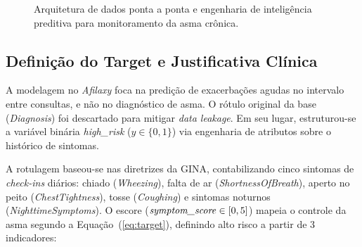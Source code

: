 \documentclass[12pt]{article}
\begin{document}
\begin{figure}[ht!]
\caption{Arquitetura de dados ponta a ponta e engenharia de inteligência preditiva para monitoramento da asma crônica.}
\label{fig:fluxograma_asma}
\end{figure}

\subsection{Definição do Target e Justificativa Clínica}

A modelagem no \textit{Afilaxy} foca na predição de exacerbações agudas no intervalo entre consultas, e não no diagnóstico de asma. O rótulo original da base (\textit{Diagnosis}) foi descartado para mitigar \textit{data leakage}. Em seu lugar, estruturou-se a variável binária \textit{high\_risk} ($y \in \{0, 1\}$) via engenharia de atributos sobre o histórico de sintomas.

A rotulagem baseou-se nas diretrizes da GINA, contabilizando cinco sintomas de \textit{check-ins} diários: chiado (\textit{Wheezing}), falta de ar (\textit{ShortnessOfBreath}), aperto no peito (\textit{ChestTightness}), tosse (\textit{Coughing}) e sintomas noturnos (\textit{NighttimeSymptoms}). O escore ($\text{\textit{symptom\_score}} \in [0, 5]$) mapeia o controle da asma segundo a Equação~(\ref{eq:target}), definindo alto risco a partir de 3 indicadores:
\end{document}
